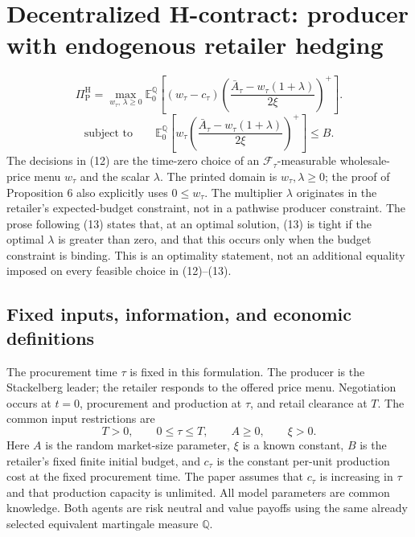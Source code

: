 \documentclass{article}
\begin{document}
\section*{Decentralized H-contract: producer with endogenous retailer hedging}

\begin{equation}
\Pi_{\mathrm P}^{\mathrm H}
=\max_{w_\tau,\,\lambda\geqslant0}
\mathbb E_0^{\mathbb Q}\left[
(w_\tau-c_\tau)
\left(\frac{\bar A_\tau-w_\tau(1+\lambda)}{2\xi}\right)^+
\right].
\tag{12}
\end{equation}
\begin{equation}
\text{subject to}\qquad
\mathbb E_0^{\mathbb Q}\left[
 w_\tau\left(\frac{\bar A_\tau-w_\tau(1+\lambda)}{2\xi}\right)^+
\right]\leqslant B.
\tag{13}
\end{equation}
The decisions in (12) are the time-zero choice of an
$\mathscr F_\tau$-measurable wholesale-price menu $w_\tau$ and the scalar
$\lambda$. The printed domain is $w_\tau,\lambda\geqslant0$; the proof of
Proposition 6 also explicitly uses $0\leqslant w_\tau$.
The multiplier $\lambda$ originates in the retailer's expected-budget
constraint, not in a pathwise producer constraint. The prose following
(13) states that, at an optimal solution, (13) is tight if the optimal
$\lambda$ is greater than zero, and that this occurs only when the budget
constraint is binding. This is an optimality statement, not an additional
equality imposed on every feasible choice in (12)--(13).

\subsection*{Fixed inputs, information, and economic definitions}

The procurement time $\tau$ is fixed in this formulation. The producer is
the Stackelberg leader; the retailer responds to the offered price menu.
Negotiation occurs at $t=0$, procurement and production at $\tau$, and
retail clearance at $T$. The common input restrictions are
\[
T>0,\qquad 0\leqslant\tau\leqslant T,\qquad A\geqslant0,\qquad \xi>0.
\]
Here $A$ is the random market-size parameter, $\xi$ is a known constant,
$B$ is the retailer's fixed finite initial budget, and $c_\tau$ is the
constant per-unit production cost at the fixed procurement time. The
paper assumes that $c_\tau$ is increasing in $\tau$ and that production
capacity is unlimited. All model parameters are common knowledge.
Both agents are risk neutral and value payoffs using the same already
selected equivalent martingale measure $\mathbb Q$.
\end{document}
